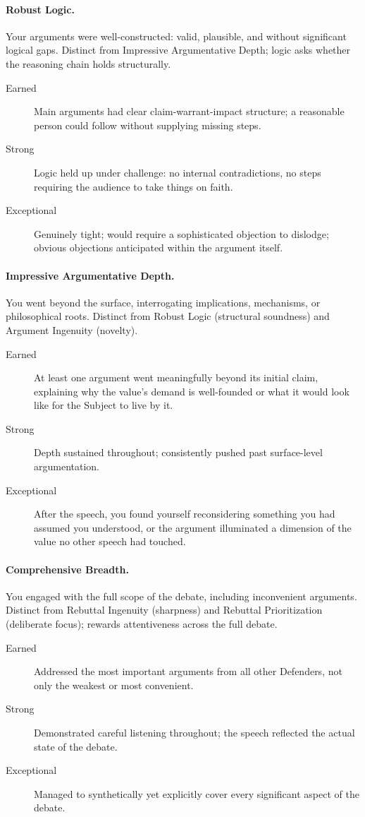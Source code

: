 \documentclass[12pt]{article}
\begin{document}
\paragraph{Robust Logic.} Your arguments were well-constructed: valid, plausible, and without significant logical gaps. Distinct from Impressive Argumentative Depth; logic asks whether the reasoning chain holds structurally.
\begin{description}
    \item[Earned] Main arguments had clear claim-warrant-impact structure; a reasonable person could follow without supplying missing steps.
    \item[Strong] Logic held up under challenge: no internal contradictions, no steps requiring the audience to take things on faith.
    \item[Exceptional] Genuinely tight; would require a sophisticated objection to dislodge; obvious objections anticipated within the argument itself.
\end{description}

\paragraph{Impressive Argumentative Depth.} You went beyond the surface, interrogating implications, mechanisms, or philosophical roots. Distinct from Robust Logic (structural soundness) and Argument Ingenuity (novelty).
\begin{description}
    \item[Earned] At least one argument went meaningfully beyond its initial claim, explaining why the value's demand is well-founded or what it would look like for the Subject to live by it.
    \item[Strong] Depth sustained throughout; consistently pushed past surface-level argumentation.
    \item[Exceptional] After the speech, you found yourself reconsidering something you had assumed you understood, or the argument illuminated a dimension of the value no other speech had touched.
\end{description}

\paragraph{Comprehensive Breadth.} You engaged with the full scope of the debate, including inconvenient arguments. Distinct from Rebuttal Ingenuity (sharpness) and Rebuttal Prioritization (deliberate focus); rewards attentiveness across the full debate.
\begin{description}
    \item[Earned] Addressed the most important arguments from all other Defenders, not only the weakest or most convenient.
    \item[Strong] Demonstrated careful listening throughout; the speech reflected the actual state of the debate.
    \item[Exceptional] Managed to synthetically yet explicitly cover every significant aspect of the debate.
\end{description}
\end{document}
